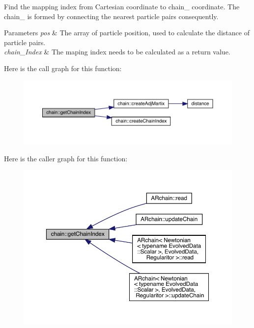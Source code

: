 Find the mapping index from Cartesian coordinate to chain_ coordinate. The chain_ is formed by connecting the nearest particle pairs consequently.
\begin{DoxyParams}{Parameters}
{\em pos} & The array of particle position, used to calculate the distance of particle pairs. \\
\hline
{\em chain_\+Index} & The maping index needs to be calculated as a return value. \\
\hline
\end{DoxyParams}
Here is the call graph for this function\+:\nopagebreak
\begin{figure}[H]
\begin{center}
\leavevmode
\includegraphics[width=350pt]{namespacechain_a3e7b0a001442f121ce1408e7c9d12016_cgraph}
\end{center}
\end{figure}
Here is the caller graph for this function\+:\nopagebreak
\begin{figure}[H]
\begin{center}
\leavevmode
\includegraphics[width=350pt]{namespacechain_a3e7b0a001442f121ce1408e7c9d12016_icgraph}
\end{center}
\end{figure}
\mbox{\label{namespacechain_a874f28a6248b56c6b2b3ca45c1bbea09}} 
